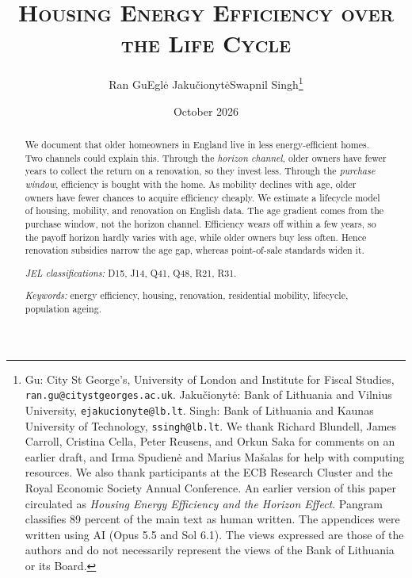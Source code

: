 \documentclass[11pt,letterpaper,english,final]{article}
\title{\vspace{-4ex}\textsc{
Housing Energy Efficiency over the Life Cycle}}
\author{Ran Gu\qquad Egl\.e Jaku\v{c}ionyt\.e\qquad Swapnil Singh\thanks{%
Gu: City St George's, University of London and Institute for Fiscal
Studies, \texttt{ran.gu@citystgeorges.ac.uk}. Jaku\v{c}ionyt\.e: Bank of Lithuania and
Vilnius University, \texttt{ejakucionyte@lb.lt}. Singh: Bank of Lithuania
and Kaunas University of Technology, \texttt{ssingh@lb.lt}. We thank
Richard Blundell, James Carroll, Cristina Cella, Peter Reusens, and Orkun
Saka for comments on an earlier draft, and Irma Spudien\.e and Marius
Ma\v{s}alas for help with computing resources. We also thank participants at
the ECB Research Cluster and the Royal Economic Society Annual Conference.
An earlier version of this paper circulated as
\emph{Housing Energy Efficiency and the Horizon Effect}.
Pangram classifies 89 percent of the
main text as human written. The appendices were written using AI (Opus 5.5 and Sol 6.1). The views expressed are those of the authors and do not
necessarily represent the views of the Bank of Lithuania or its Board.}}
\date{October 2026}
\numberwithin{equation}{section}
\theoremstyle{plain}
\theoremstyle{remark}
\begin{document}
\hypersetup{pageanchor=false}
\maketitle
\thispagestyle{empty}

\begin{abstract}
We document that older homeowners in England live in less energy-efficient homes. Two
channels could explain this. Through the \emph{horizon channel}, older owners have
fewer years to collect the return on a renovation, so they invest less.
Through the \emph{purchase window}, efficiency is bought with the home. As mobility declines with age, older owners have fewer chances
to acquire efficiency cheaply. We estimate a lifecycle model of housing, mobility, and renovation on
English data. The age gradient comes from the purchase window, not the
horizon channel. Efficiency
wears off within a few years, so the payoff horizon hardly varies with age,
while older owners buy less often. Hence renovation subsidies narrow the age
gap, whereas point-of-sale standards widen it.

\medskip
\noindent\textit{JEL classifications:} D15, J14, Q41, Q48, R21, R31.\par
\noindent\textit{Keywords:} energy efficiency, housing, renovation,
residential mobility, lifecycle, population ageing.
\end{abstract}

\newpage
\hypersetup{pageanchor=true}









\clearpage



\clearpage
\appendix
\renewcommand{\thetable}{\thesection\arabic{table}}
\renewcommand{\thefigure}{\thesection\arabic{figure}}
\setcounter{table}{0}
\setcounter{figure}{0}






\end{document}
